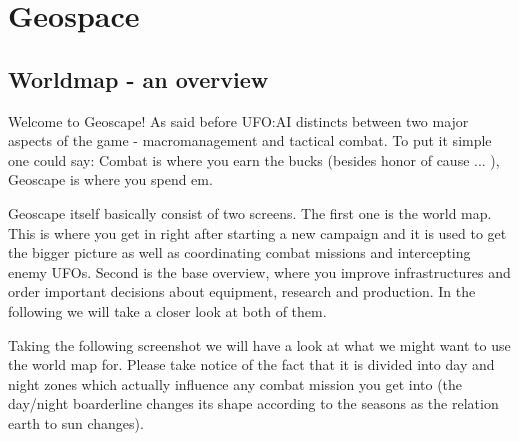 
%
%


\section{Geospace}

\subsection{Worldmap - an overview} 
Welcome to Geoscape! As said before UFO:AI distincts between two major aspects of the game - macromanagement and tactical combat. To put it simple one could say: Combat is where you earn the bucks (besides honor of cause ... ), Geoscape is where you spend em.

Geoscape itself basically consist of two screens. The first one is the world map. This is where you get in right after starting a new campaign and it is used to get the bigger picture as well as coordinating combat missions and intercepting enemy UFOs. Second is the base overview, where you improve infrastructures and order important decisions about equipment, research and production. In the following we will take a closer look at both of them.

Taking the following screenshot we will have a look at what we might want to use the world map for.
Please take notice of the fact that it is divided into day and night zones which actually influence any combat mission you get into (the day/night boarderline changes its shape according to the seasons as the relation earth to sun changes).\\

